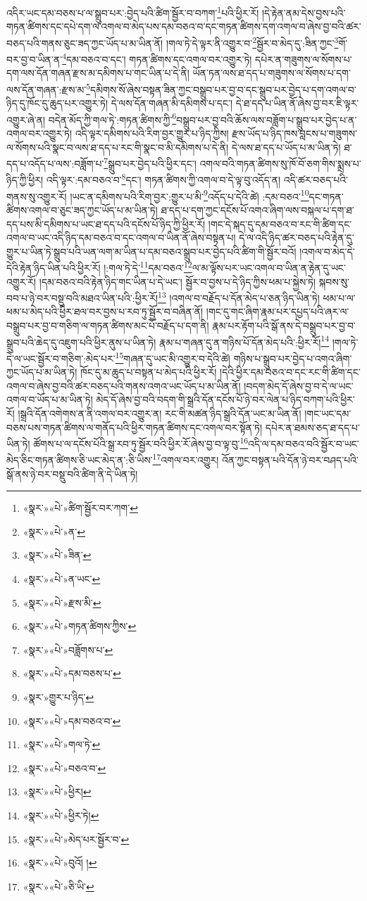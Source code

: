 འདིར་ཡང་དམ་བཅས་པ་ལ་སྒྲུབ་པར་:བྱེད་པའི་ཚིག་སྦྱོར་བ་བཀག་\footnote{«སྣར་»«པེ་»ཚིག་སྦྱོར་བར་ཀག་}པའི་ཕྱིར་རོ། །དེ་རྟེན་ནམ་དེས་བྱས་པའི་གཏན་ཚིགས་དང་དཔེ་དག་ལ་འགལ་བ་མེད་པས་དམ་བཅའ་བ་དང་གཏན་ཚིགས་དག་འགལ་བ་ཞེས་བྱ་བའི་ཚར་བཅད་པའི་གནས་ཅུང་ཟད་ཀྱང་ཡོད་པ་མ་ཡིན་ནོ། །གལ་ཏེ་དེ་ལྟར་ནི་འགྱུར་བ་\footnote{«སྣར་»«པེ་»ན་}སྦྱོར་བ་མེད་དུ་:ཟིན་ཀྱང་\footnote{«སྣར་»«པེ་»ཟིན་}གོ་བར་བྱ་བ་ཡིན་ན་\footnote{«སྣར་»«པེ་»ན་ཡང་}དམ་བཅའ་བ་དང་། གཏན་ཚིགས་དང་འགལ་བར་འགྱུར་ཏེ། དཔེར་ན་གཟུགས་ལ་སོགས་པ་དག་ལས་དོན་གཞན་རྫས་མ་དམིགས་པ་གང་ཡིན་པ་དེ་ནི། ཡོན་ཏན་ལས་ཐ་དད་པ་གཟུགས་ལ་སོགས་པ་དག་ལས་དོན་གཞན་:རྫས་མ་\footnote{«སྣར་»«པེ་»རྫས་མི་}དམིགས་སོ་ཞེས་བསྟན་ཟིན་ཀྱང་བསྒྲུབ་པར་བྱ་བ་དང་སྒྲུབ་པར་བྱེད་པ་དག་འགལ་བ་ཉིད་དུ་ཁོང་དུ་ཆུད་པར་འགྱུར་ཏེ། དེ་ལས་དོན་གཞན་མི་དམིགས་པ་དང་། དེ་ཐ་དད་པ་ཡིན་ནོ་ཞེས་བྱ་བར་ཇི་ལྟར་འགྱུར་ཞེ་ན། བདེན་མོད་ཀྱི་གལ་ཏེ་:གཏན་ཚིགས་ཀྱི་\footnote{«སྣར་»«པེ་»གཏན་ཚིགས་ཀྱིས་}བསྒྲུབ་པར་བྱ་བའི་ཆོས་ལས་བཟློག་པ་སྒྲུབ་པར་བྱེད་པ་ན་འགལ་བར་འགྱུར་ཏེ། འདི་ལྟར་དམིགས་པའི་རིག་བྱར་གྱུར་པ་ཉིད་ཀྱིས། རྫས་ཡོད་པ་ཉིད་ཁས་བླངས་པ་གཟུགས་ལ་སོགས་པའི་སྣང་བ་ལས་ཐ་དད་པ་རང་གི་སྣང་བ་མི་དམིགས་པ་དེ་ནི། དེ་ལས་ཐ་དད་པ་ཡོད་པ་མ་ཡིན་ཏེ། ཐ་དད་པ་འདོད་པ་ལས་:བཟློག་པ་\footnote{«སྣར་»«པེ་»བཟློགས་པ་}སྒྲུབ་པར་བྱེད་པའི་ཕྱིར་དང་། འགལ་བའི་གཏན་ཚིགས་སུ་ཁོ་བོ་ཅག་གིས་སྨྲས་པ་ཉིད་ཀྱི་ཕྱིར། འདི་ལྟར་:དམ་བཅའ་བ་\footnote{«སྣར་»«པེ་»དམ་བཅས་པ་}དང་། གཏན་ཚིགས་ཀྱི་འགལ་བ་དེ་ལྟ་བུ་འདོད་ན། འདི་ཚར་བཅད་པའི་གནས་སུ་འགྱུར་རོ། །ཡང་ན་དམིགས་པའི་རིག་བྱར་:གྱུར་པ་མི་\footnote{«སྣར་»གྱུར་པ་ཉིད་}འདོད་པ་དེའི་ཚེ། :དམ་བཅའ་\footnote{«སྣར་»«པེ་»དམ་བཅའ་བ་}དང་གཏན་ཚིགས་འགལ་བ་ཅུང་ཟད་ཀྱང་ཡོད་པ་མ་ཡིན་ཏེ། ཐ་དད་པ་དག་ཀྱང་དངོས་པོ་འགའ་ཞིག་ལས་བསྐལ་པ་དག་ཐ་དད་པས་མི་དམིགས་པ་ཡང་ཐ་དད་པའི་དངོས་པོ་ཉིད་ཀྱི་ཕྱིར་རོ། །གང་དེ་སྐད་དུ་དམ་བཅའ་བ་རང་གི་ཚིག་དང་འགལ་བ་ཡང་འདི་ཉིད་དམ་བཅའ་བ་དང་འགལ་བ་ཡིན་ནོ་ཞེས་བསྟན་པ། དེ་ལ་འདི་ཉིད་ཚར་བཅད་པའི་རྟེན་དུ་གྱུར་པ་ཡིན་ཏེ་སྒྲུབ་པའི་ཡན་ལག་མ་ཡིན་པ་དམ་བཅའ་སྒྲུབ་པར་བྱེད་པའི་ཚིག་གི་སྦྱོར་བའོ། །འགལ་བ་མེད་དེ་དེའི་རྟེན་ཉིད་ཡིན་པའི་ཕྱིར་རོ། །:གལ་ཏེ་དེ་\footnote{«སྣར་»«པེ་»གལ་ཏེ་}དམ་བཅའ་\footnote{«སྣར་»«པེ་»བཅའ་བ་}ལ་མ་ལྟོས་པར་ཡང་འགལ་བ་ཡིན་ན་རྟེན་དུ་ཡང་འགྱུར་རོ། །དམ་བཅའ་བའི་རྟེན་ཉིད་གང་ཡིན་པ་དེ་ཡང་། སྦྱོར་བ་བྱས་པ་དེ་ཉིད་ཀྱིས་ཕམ་པ་སྐྱེས་ཏེ། སྐབས་སུ་བབ་པ་ཉེ་བར་བསྡུ་བའི་མཐའ་ཡིན་པའི་:ཕྱིར་རོ།\footnote{«སྣར་»«པེ་»ཕྱིར།} །འགལ་བ་བརྗོད་པ་དོན་མེད་པ་ཅན་ཉིད་ཡིན་ཏེ། ཕམ་པ་ལ་ཕམ་པ་མེད་པའི་ཕྱིར་ཐལ་བར་བྱས་པ་རབ་ཏུ་སྦྱོར་བ་བཞིན་ནོ། །གང་དུ་གང་ཞིག་རྣམ་པར་དཔྱད་པའི་ཞར་ལ་བསྒྲུབ་པར་བྱ་བ་གཅིག་ལ་གཏན་ཚིགས་མང་པོ་བརྗོད་པ་དག་ནི། རྣམ་པར་རྟོག་པའི་སྒོ་ནས་དེ་བསྒྲུབ་པར་བྱ་བ་སྒྲུབ་པའི་ཆེད་དུ་འཇུག་པའི་ཕྱིར་ནུས་པ་ཡིན་ཏེ། རྣམ་པ་གཞན་དུ་ན་གཉིས་པོ་དོན་མེད་པའི་:ཕྱིར་རོ།\footnote{«སྣར་»«པེ་»ཕྱིར་ཏེ།} །གལ་ཏེ་དེ་ལ་ཡང་སྦྱོར་བ་གཅིག་:མེད་པར་\footnote{«སྣར་»«པེ་»མེད་པར་སྦྱོར་བ་}གཞན་དུ་ཡང་མི་འགྱུར་བ་དེའི་ཚེ། གཉིས་པ་སྒྲུབ་པར་བྱེད་པ་འགའ་ཞིག་ཀྱང་ཡོད་པ་མ་ཡིན་ཏེ། ཁོང་དུ་མ་ཆུད་པ་བསྟན་པ་མེད་པའི་ཕྱིར་རོ། །དེའི་ཕྱིར་དམ་བཅའ་བ་དང་རང་གི་ཚིག་དང་འགལ་བ་ཞེས་བྱ་བའི་ཚར་བཅད་པའི་གནས་འགའ་ཡང་ཡོད་པ་མ་ཡིན་ནོ། །བདག་མེད་དོ་ཞེས་བྱ་བ་དེ་ལ་ཡང་འགལ་བ་ཡོད་པ་མ་ཡིན་ཏེ། མེད་དོ་ཞེས་བྱ་བའི་བདག་གི་སྒྲའི་དོན་དངོས་པོ་ཉེ་བར་ལེན་པ་ཉིད་བཀག་པའི་ཕྱིར་རོ། །སྒྲའི་དོན་འགེགས་ན་ནི་འགལ་བར་འགྱུར་ན། རང་གི་མཚན་ཉིད་སྒྲའི་དོན་ཡང་མ་ཡིན་ནོ། །གང་ཡང་དམ་བཅས་པས་གཏན་ཚིགས་ལ་གནོད་པའི་ཕྱིར་གཏན་ཚིགས་དང་འགལ་བར་སྟོན་ཏེ། དཔེར་ན་ཐམས་ཅད་ཐ་དད་པ་ཡིན་ཏེ། ཚོགས་པ་ལ་དངོས་པོའི་སྒྲ་རབ་ཏུ་སྦྱོར་བའི་ཕྱིར་རོ་ཞེས་བྱ་བ་ལྟ་བུ་\footnote{«སྣར་»«པེ་»བུའོ། །}འདི་ལ་དམ་བཅའ་བའི་སྦྱོར་བ་ཡང་མེད་ཅིང་གཏན་ཚིགས་ཅི་ཡང་མེད་ན་:ཅི་ཡིས་\footnote{«སྣར་»«པེ་»ཅི་ཡི་}འགལ་བར་འགྱུར། འོན་ཀྱང་བསྟན་པའི་དོན་ཉེ་བར་བཤད་པའི་སྒོ་ནས་ཉེ་བར་བསྡུ་བའི་ཚིག་ནི་དེ་ཡིན་ཏེ། 